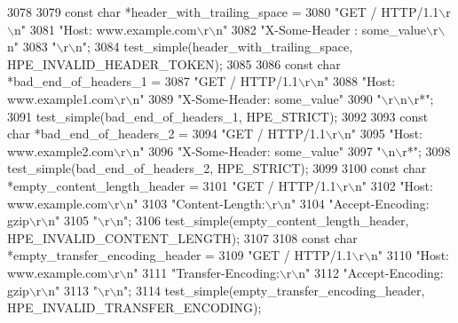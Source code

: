 \begin{DoxyCode}
{{{3078 
3079   \textcolor{keyword}{const} \textcolor{keywordtype}{char} *header\_with\_trailing\_space =
3080     \textcolor{stringliteral}{"GET / HTTP/1.1\(\backslash\)r\(\backslash\)n"}
3081     \textcolor{stringliteral}{"Host: www.example.com\(\backslash\)r\(\backslash\)n"}
3082     \textcolor{stringliteral}{"X-Some-Header : some\_value\(\backslash\)r\(\backslash\)n"}
3083     \textcolor{stringliteral}{"\(\backslash\)r\(\backslash\)n"};
3084   test_simple(header\_with\_trailing\_space, HPE_INVALID_HEADER_TOKEN);
3085 
3086   \textcolor{keyword}{const} \textcolor{keywordtype}{char} *bad\_end\_of\_headers\_1 =
3087     \textcolor{stringliteral}{"GET / HTTP/1.1\(\backslash\)r\(\backslash\)n"}
3088     \textcolor{stringliteral}{"Host: www.example1.com\(\backslash\)r\(\backslash\)n"}
3089     \textcolor{stringliteral}{"X-Some-Header: some\_value"}
3090     \textcolor{stringliteral}{"\(\backslash\)r\(\backslash\)n\(\backslash\)r*"};
3091   test_simple(bad\_end\_of\_headers\_1, HPE_STRICT);
3092 
3093   \textcolor{keyword}{const} \textcolor{keywordtype}{char} *bad\_end\_of\_headers\_2 =
3094     \textcolor{stringliteral}{"GET / HTTP/1.1\(\backslash\)r\(\backslash\)n"}
3095     \textcolor{stringliteral}{"Host: www.example2.com\(\backslash\)r\(\backslash\)n"}
3096     \textcolor{stringliteral}{"X-Some-Header: some\_value"}
3097     \textcolor{stringliteral}{"\(\backslash\)n\(\backslash\)r*"};
3098   test_simple(bad\_end\_of\_headers\_2, HPE_STRICT);
3099 
3100   \textcolor{keyword}{const} \textcolor{keywordtype}{char} *empty\_content\_length\_header =
3101     \textcolor{stringliteral}{"GET / HTTP/1.1\(\backslash\)r\(\backslash\)n"}
3102     \textcolor{stringliteral}{"Host: www.example.com\(\backslash\)r\(\backslash\)n"}
3103     \textcolor{stringliteral}{"Content-Length:\(\backslash\)r\(\backslash\)n"}
3104     \textcolor{stringliteral}{"Accept-Encoding: gzip\(\backslash\)r\(\backslash\)n"}
3105     \textcolor{stringliteral}{"\(\backslash\)r\(\backslash\)n"};
3106   test_simple(empty\_content\_length\_header, HPE_INVALID_CONTENT_LENGTH);
3107 
3108   \textcolor{keyword}{const} \textcolor{keywordtype}{char} *empty\_transfer\_encoding\_header =
3109     \textcolor{stringliteral}{"GET / HTTP/1.1\(\backslash\)r\(\backslash\)n"}
3110     \textcolor{stringliteral}{"Host: www.example.com\(\backslash\)r\(\backslash\)n"}
3111     \textcolor{stringliteral}{"Transfer-Encoding:\(\backslash\)r\(\backslash\)n"}
3112     \textcolor{stringliteral}{"Accept-Encoding: gzip\(\backslash\)r\(\backslash\)n"}
3113     \textcolor{stringliteral}{"\(\backslash\)r\(\backslash\)n"};
3114   test_simple(empty\_transfer\_encoding\_header, HPE_INVALID_TRANSFER_ENCODING);
}}}
\end{DoxyCode}

